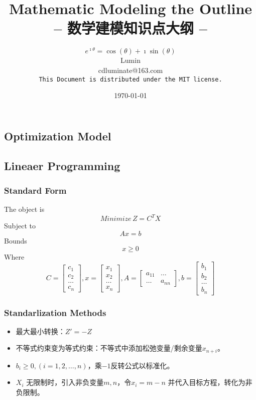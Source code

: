 \documentclass[12pt,a4paper]{article} \usepackage{kurier}
\title{Mathematic Modeling the Outline\\ -- 数学建模知识点大纲 --}
\author{$e^{\imath \theta} = \cos(\theta) + \imath \sin(\theta)$ \\ Lumin\\cdluminate@163.com\\\texttt{This Document is distributed under the MIT license.} }
\date{\today}
\begin{document}
\begin{CJK}{UTF8}{gkai}

\maketitle
\tableofcontents
\newpage

\section{Optimization Model}
\begin{multicols}{2}
	\subsection{Lineaer Programming}
		\subsubsection{Standard Form}
			The object is
			\[ Minimize\, Z = C^T X \]
			Subject to
			\[ Ax = b \]
			Bounds
			\[ x \geqslant 0 \]
			Where
			\[ C = \begin{bmatrix} c_1 \\ c_2 \\ \ldots \\ c_n \end{bmatrix} , x = \begin{bmatrix} x_1 \\ x_2 \\ \ldots \\ x_n \end{bmatrix} , A = \begin{bmatrix} a_{11} & \ldots \\ \ldots  & a_{nn} \end{bmatrix} , b = \begin{bmatrix} b_1 \\ b_2 \\ \ldots \\ b_n \end{bmatrix} \]
		\subsubsection{Standarlization Methods}
			\begin{itemize}
			\item 最大最小转换：$Z' = -Z$
			\item 不等式约束变为等式约束：不等式中添加松弛变量/剩余变量$x_{n+i}$。
			\item $b_i \geq 0, (i = 1,2,\ldots,n)$，乘$-1$反转公式以标准化。
			\item $X_i$ 无限制时，引入非负变量$m,n$，令$x_i = m - n$ 并代入目标方程，转化为非负限制。
			\end{itemize}

\end{multicols}
\end{CJK}
\end{document}
